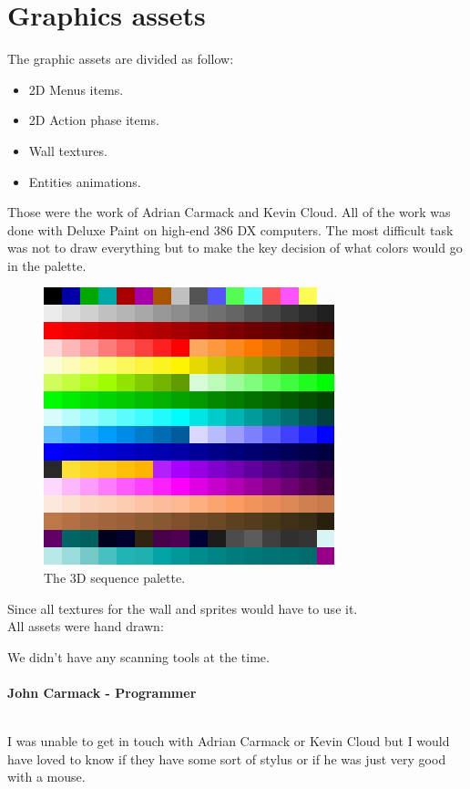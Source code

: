 \documentclass[book.tex]{subfiles}
\begin{document}
 
 
 




\section{Graphics assets}
The graphic assets are divided as follow:
\begin{itemize}
\item 2D Menus items.
\item 2D Action phase items.
\item Wall textures.
\item Entities animations.
\end{itemize}
Those were the work of Adrian Carmack and Kevin Cloud. All of the work was done with Deluxe Paint on high-end 386 DX computers. The most difficult task was not to draw everything but to make the key decision of what colors would go in the palette.\\
\begin{figure}[H]
  \centering
 \includegraphics[width=\textwidth]{imgs/palette.png}
 \caption{The 3D sequence palette.} \label{fig:palette}
\end{figure}

Since all textures for the wall and sprites would have to use it.\\
All assets were hand drawn:\\
\begin{fancyquotes}
We didn't have any scanning tools at the time.\\
\\
\textbf{John Carmack - Programmer}
\end{fancyquotes}
\\
I was unable to get in touch with Adrian Carmack or Kevin Cloud but I would have loved to know if they have some sort of stylus or if he was just very good with a mouse.\\
\end{document}
